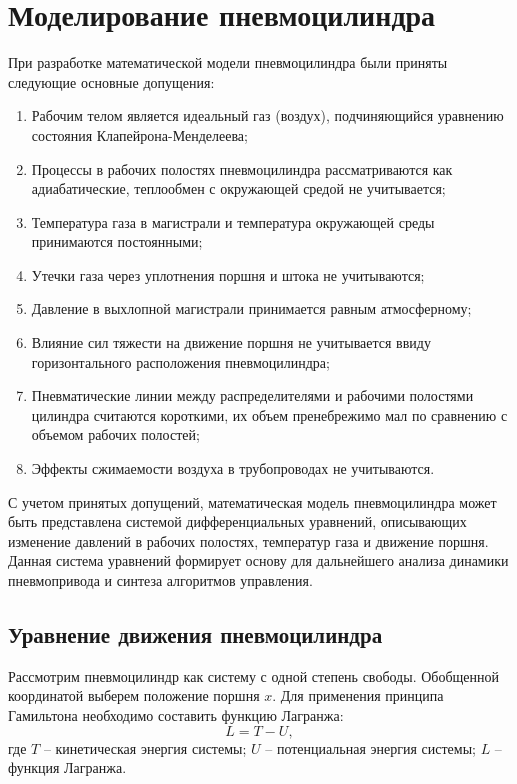 
\section{Моделирование пневмоцилиндра}\label{sec:ch2/sec2}

При разработке математической модели пневмоцилиндра были приняты следующие основные допущения:
\begin{enumerate}
    \item Рабочим телом является идеальный газ (воздух), подчиняющийся уравнению состояния Клапейрона-Менделеева;
    \item Процессы в рабочих полостях пневмоцилиндра рассматриваются как адиабатические, теплообмен с окружающей средой не учитывается;
    \item Температура газа в магистрали и температура окружающей среды принимаются постоянными;
    \item Утечки газа через уплотнения поршня и штока не учитываются;
    \item Давление в выхлопной магистрали принимается равным атмосферному;
    \item Влияние сил тяжести на движение поршня не учитывается ввиду горизонтального расположения пневмоцилиндра;
    \item Пневматические линии между распределителями и рабочими полостями цилиндра считаются короткими,
          их объем пренебрежимо мал по сравнению с объемом рабочих полостей;
    \item Эффекты сжимаемости воздуха в трубопроводах не учитываются.
\end{enumerate}

С учетом принятых допущений, математическая модель пневмоцилиндра может быть представлена системой
дифференциальных уравнений, описывающих изменение давлений в рабочих полостях, температур газа и
движение поршня. Данная система уравнений формирует основу для дальнейшего анализа динамики пневмопривода
и синтеза алгоритмов управления.

\subsection{Уравнение движения пневмоцилиндра}\label{sec:ch2/sec2/subsec1}

Рассмотрим пневмоцилиндр как систему с одной степень свободы. Обобщенной координатой выберем положение поршня $x$.
Для применения принципа Гамильтона необходимо составить функцию Лагранжа:
\begin{equation}
\label{eq:ch2/eq0}
    L = T - U,
\end{equation}
где $T$ -- кинетическая энергия системы; $U$ -- потенциальная энергия системы; $L$ -- функция Лагранжа.

